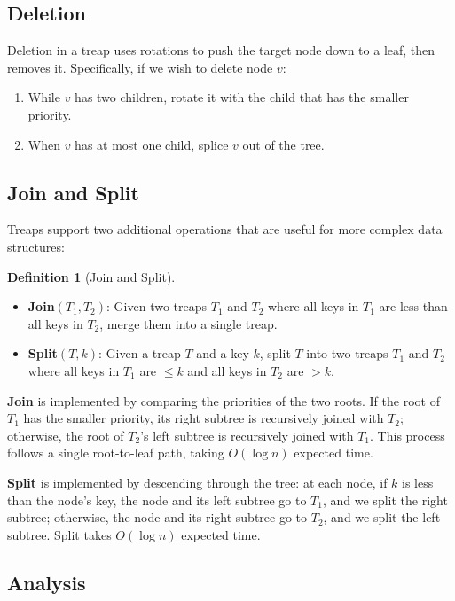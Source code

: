 \documentclass[twoside,12pt]{book}
\theoremstyle{plain}
\theoremstyle{definition}
\newtheorem{definition}[theorem]{Definition}
\theoremstyle{remark}
\begin{document}
\subsection{Deletion}

Deletion in a treap uses rotations to push the target node down to a leaf, then removes it. Specifically, if we wish to delete node $v$:
\begin{enumerate}[nosep]
    \item While $v$ has two children, rotate it with the child that has the smaller priority.
    \item When $v$ has at most one child, splice $v$ out of the tree.
\end{enumerate}

\subsection{Join and Split}

Treaps support two additional operations that are useful for more complex data structures:

\begin{definition}[Join and Split]
\begin{itemize}[nosep]
    \item \textbf{Join}$(T_1, T_2)$: Given two treaps $T_1$ and $T_2$ where all keys in $T_1$ are less than all keys in $T_2$, merge them into a single treap.
    \item \textbf{Split}$(T, k)$: Given a treap $T$ and a key $k$, split $T$ into two treaps $T_1$ and $T_2$ where all keys in $T_1$ are $\leq k$ and all keys in $T_2$ are $> k$.
\end{itemize}
\end{definition}

\textbf{Join} is implemented by comparing the priorities of the two roots. If the root of $T_1$ has the smaller priority, its right subtree is recursively joined with $T_2$; otherwise, the root of $T_2$'s left subtree is recursively joined with $T_1$. This process follows a single root-to-leaf path, taking $O(\log n)$ expected time.

\textbf{Split} is implemented by descending through the tree: at each node, if $k$ is less than the node's key, the node and its left subtree go to $T_1$, and we split the right subtree; otherwise, the node and its right subtree go to $T_2$, and we split the left subtree. Split takes $O(\log n)$ expected time.

\subsection{Analysis}
\end{document}
